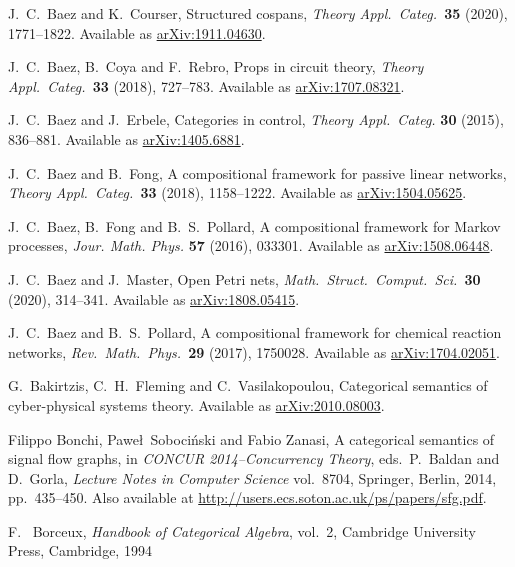 \documentclass[reqno]{amsart}
\begin{document}
\begin{thebibliography}{100}

 J.\ C.\ Baez and K.\ Courser, Structured cospans,  \textsl{Theory Appl.\ Categ.\ }\textbf{35} (2020), 1771--1822.   Available as \href{http://arxiv.org/abs/1911.04630}{arXiv:1911.04630}.

 J.\ C.\ Baez, B.\ Coya and F.\ Rebro, Props in circuit theory, \textsl{Theory Appl.\ Categ.\ }\textbf{33} (2018), 727--783.    Available as \href{https://arxiv.org/abs/1707.08321}{arXiv:1707.08321}. 

 J.\ C.\ Baez and J.\ Erbele, Categories in control, \textsl{Theory Appl.\ Categ.} {\bf 30} (2015), 836--881. Available as \href{http://arxiv.org/abs/1405.6881}{arXiv:1405.6881}.

  J.\ C.\ Baez and B.\ Fong, A compositional framework for passive linear networks, \textsl{Theory Appl.\ Categ.\ }\textbf{33} (2018), 1158--1222.  Available as \href{http://arxiv.org/abs/1504.05625}{arXiv:1504.05625}.

 J.\ C.\ Baez, B.\ Fong and B.\ S.\ Pollard, A compositional framework for Markov processes, \textsl{Jour. Math. Phys.} \textbf{57} (2016), 033301. Available as \href{http://arxiv.org/abs/1508.06448}{arXiv:1508.06448}.

  J.\ C.\ Baez and J.\ Master, Open Petri nets, \textsl{Math.\ Struct.\ Comput.\ Sci.\ }\textbf{30} (2020), 314--341. Available as 
\href{https://arxiv.org/abs/1808.05415}{arXiv:1808.05415}. 

 J.\ C.\ Baez and B.\ S.\ Pollard, A compositional framework for chemical reaction networks, \textsl{Rev.\ Math.\ Phys.\ }\textbf{29} (2017), 1750028.  Available as \href{http://arxiv.org/abs/1704.02051}{arXiv:1704.02051}.

 G.\ Bakirtzis, C.\ H.\ Fleming and C.\ Vasilakopoulou, Categorical semantics of cyber-physical systems theory. Available as 
\href{https://arxiv.org/abs/2010.08003}{arXiv:2010.08003}.

 Filippo Bonchi, Pawe\l~Soboci\'nski and Fabio Zanasi, A categorical semantics of signal flow graphs, in \textsl{CONCUR 2014--Concurrency Theory}, eds.\ P.\ Baldan and D.\ Gorla, \textsl{Lecture Notes in Computer Science} vol.\ 8704, Springer, Berlin, 2014, pp.\ 435--450.  Also available at \href{http://users.ecs.soton.ac.uk/ps/papers/sfg.pdf}{http://users.ecs.soton.ac.uk/ps/papers/sfg.pdf}.

 F. \ Borceux, \textsl{Handbook of Categorical Algebra}, vol.\ 2, 
Cambridge University Press, Cambridge, 1994


\end{thebibliography}
\end{document}
